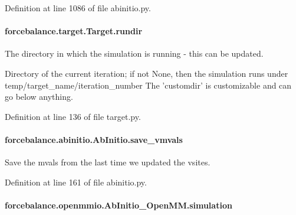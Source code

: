 Definition at line 1086 of file abinitio.\-py.

\hypertarget{classforcebalance_1_1target_1_1Target_a6872de5b2d4273b82336ea5b0da29c9e}{
\paragraph[{rundir}]{\setlength{\rightskip}{0pt plus 5cm}forcebalance.\-target.\-Target.\-rundir\hspace{0.3cm}{\ttfamily [inherited]}}}\label{classforcebalance_1_1target_1_1Target_a6872de5b2d4273b82336ea5b0da29c9e}


The directory in which the simulation is running -\/ this can be updated. 

Directory of the current iteration; if not None, then the simulation runs under temp/target\-\_\-name/iteration\-\_\-number The 'customdir' is customizable and can go below anything.

Definition at line 136 of file target.\-py.

\hypertarget{classforcebalance_1_1abinitio_1_1AbInitio_a22037bf43728fa45f387390005e0b131}{
\paragraph[{save\-\_\-vmvals}]{\setlength{\rightskip}{0pt plus 5cm}forcebalance.\-abinitio.\-Ab\-Initio.\-save\-\_\-vmvals\hspace{0.3cm}{\ttfamily [inherited]}}}\label{classforcebalance_1_1abinitio_1_1AbInitio_a22037bf43728fa45f387390005e0b131}


Save the mvals from the last time we updated the vsites. 



Definition at line 161 of file abinitio.\-py.

\hypertarget{classforcebalance_1_1openmmio_1_1AbInitio__OpenMM_ad999b78640bdd1bb9ea09f5ce82c95d7}{
\paragraph[{simulation}]{\setlength{\rightskip}{0pt plus 5cm}forcebalance.\-openmmio.\-Ab\-Initio\-\_\-\-Open\-M\-M.\-simulation}}\label{classforcebalance_1_1openmmio_1_1AbInitio__OpenMM_ad999b78640bdd1bb9ea09f5ce82c95d7}


